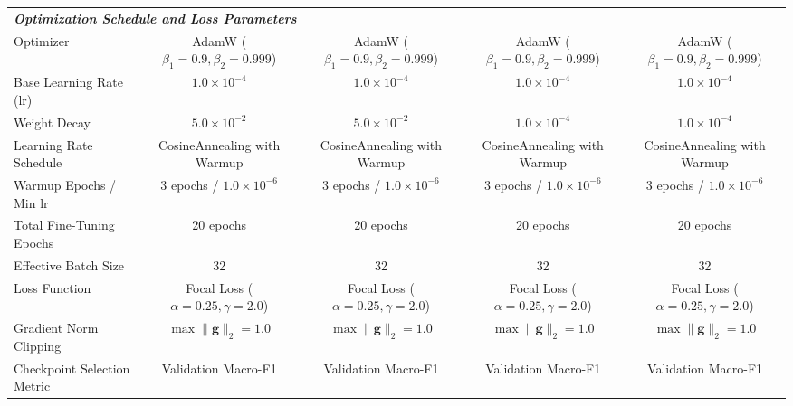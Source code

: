 \documentclass[a4paper,fleqn]{cas-sc}
\begin{document}
\begin{table}[pos=htbp]
{\begin{tabular}{lcccc}
\midrule
\multicolumn{5}{l}{\textit{\textbf{Optimization Schedule and Loss Parameters}}} \\
Optimizer & AdamW ($\beta_1=0.9, \beta_2=0.999$) & AdamW ($\beta_1=0.9, \beta_2=0.999$) & AdamW ($\beta_1=0.9, \beta_2=0.999$) & AdamW ($\beta_1=0.9, \beta_2=0.999$) \\
Base Learning Rate ($\text{lr}$) & $1.0 \times 10^{-4}$ & $1.0 \times 10^{-4}$ & $1.0 \times 10^{-4}$ & $1.0 \times 10^{-4}$ \\
Weight Decay & $5.0 \times 10^{-2}$ & $5.0 \times 10^{-2}$ & $1.0 \times 10^{-4}$ & $1.0 \times 10^{-4}$ \\
Learning Rate Schedule & CosineAnnealing with Warmup & CosineAnnealing with Warmup & CosineAnnealing with Warmup & CosineAnnealing with Warmup \\
Warmup Epochs / Min $\text{lr}$ & 3 epochs / $1.0 \times 10^{-6}$ & 3 epochs / $1.0 \times 10^{-6}$ & 3 epochs / $1.0 \times 10^{-6}$ & 3 epochs / $1.0 \times 10^{-6}$ \\
Total Fine-Tuning Epochs & 20 epochs & 20 epochs & 20 epochs & 20 epochs \\
Effective Batch Size & 32 & 32 & 32 & 32 \\
Loss Function & Focal Loss ($\alpha=0.25, \gamma=2.0$) & Focal Loss ($\alpha=0.25, \gamma=2.0$) & Focal Loss ($\alpha=0.25, \gamma=2.0$) & Focal Loss ($\alpha=0.25, \gamma=2.0$) \\
Gradient Norm Clipping & $\max \|\boldsymbol{g}\|_2 = 1.0$ & $\max \|\boldsymbol{g}\|_2 = 1.0$ & $\max \|\boldsymbol{g}\|_2 = 1.0$ & $\max \|\boldsymbol{g}\|_2 = 1.0$ \\
Checkpoint Selection Metric & Validation Macro-F1 & Validation Macro-F1 & Validation Macro-F1 & Validation Macro-F1 \\
\bottomrule
\end{tabular}%
}
\end{table}
\end{document}
